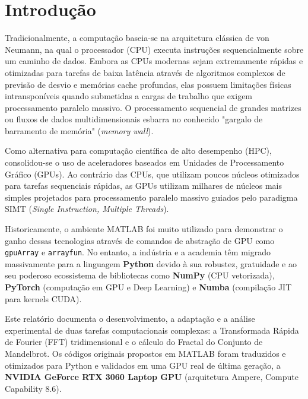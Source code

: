 \documentclass[12pt,a4paper]{article}
\begin{document}
\setcounter{page}{1}

\section{Introdução}
Tradicionalmente, a computação baseia-se na arquitetura clássica de von Neumann, na qual o processador (CPU) executa instruções sequencialmente sobre um caminho de dados. Embora as CPUs modernas sejam extremamente rápidas e otimizadas para tarefas de baixa latência através de algoritmos complexos de previsão de desvio e memórias cache profundas, elas possuem limitações físicas intransponíveis quando submetidas a cargas de trabalho que exigem processamento paralelo massivo. O processamento sequencial de grandes matrizes ou fluxos de dados multidimensionais esbarra no conhecido "gargalo de barramento de memória" (\textit{memory wall}).

Como alternativa para computação científica de alto desempenho (HPC), consolidou-se o uso de aceleradores baseados em Unidades de Processamento Gráfico (GPUs). Ao contrário das CPUs, que utilizam poucos núcleos otimizados para tarefas sequenciais rápidas, as GPUs utilizam milhares de núcleos mais simples projetados para processamento paralelo massivo guiados pelo paradigma SIMT (\textit{Single Instruction, Multiple Threads}). 

Historicamente, o ambiente MATLAB foi muito utilizado para demonstrar o ganho dessas tecnologias através de comandos de abstração de GPU como \texttt{gpuArray} e \texttt{arrayfun}. No entanto, a indústria e a academia têm migrado massivamente para a linguagem \textbf{Python} devido à sua robustez, gratuidade e ao seu poderoso ecossistema de bibliotecas como \textbf{NumPy} (CPU vetorizada), \textbf{PyTorch} (computação em GPU e Deep Learning) e \textbf{Numba} (compilação JIT para kernels CUDA).

Este relatório documenta o desenvolvimento, a adaptação e a análise experimental de duas tarefas computacionais complexas: a Transformada Rápida de Fourier (FFT) tridimensional e o cálculo do Fractal do Conjunto de Mandelbrot. Os códigos originais propostos em MATLAB foram traduzidos e otimizados para Python e validados em uma GPU real de última geração, a \textbf{NVIDIA GeForce RTX 3060 Laptop GPU} (arquitetura Ampere, Compute Capability 8.6).

\end{document}
